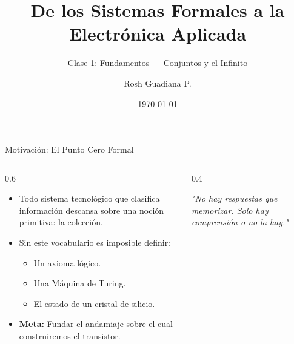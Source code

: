 \documentclass[10pt, aspectratio=169]{beamer}
\title{De los Sistemas Formales a la Electrónica Aplicada}
\subtitle{Clase 1: Fundamentos — Conjuntos y el Infinito}
\author{Rosh Guadiana P.}
\date{\today}
\institute{Ingeniería y Ciencias Físicas}
\begin{document}
\maketitle

\begin{frame}{Motivación: El Punto Cero Formal}
    \begin{columns}
        \begin{column}{0.6\textwidth}
            \begin{itemize}
                \item Todo sistema tecnológico que clasifica información descansa sobre una noción primitiva: la \alert{colección}.
                \item Sin este vocabulario es imposible definir:
                \begin{itemize}
                    \item Un axioma lógico.
                    \item Una Máquina de Turing.
                    \item El estado de un cristal de silicio.
                \end{itemize}
                \item \textbf{Meta:} Fundar el andamiaje sobre el cual construiremos el transistor.
            \end{itemize}
        \end{column}
        \begin{column}{0.4\textwidth}
            \centering
            \vspace{0.5cm}
            \small \textit{"No hay respuestas que memorizar. Solo hay comprensión o no la hay."}
        \end{column}
    \end{columns}
\end{frame}
\end{document}
